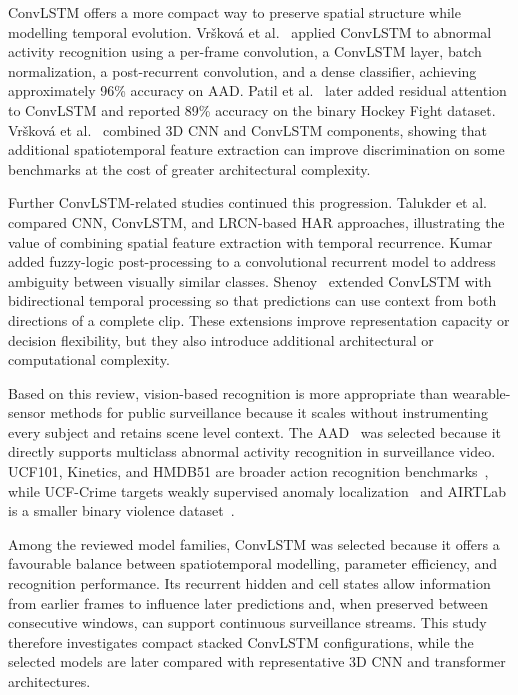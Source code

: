 \documentclass[journal,article,submit,moreauthors]{Definitions/mdpi}
\begin{document}
    ConvLSTM offers a more compact way to preserve spatial structure while 
    modelling temporal evolution. Vršková et al.~\cite{vrskova2022} applied 
    ConvLSTM to abnormal activity recognition using a per-frame convolution, 
    a ConvLSTM layer, batch normalization, a post-recurrent convolution,
    and a dense classifier, achieving approximately 96\% accuracy on AAD. 
    Patil et al.~\cite{residual_attention_convlstm2023} later added residual
    attention to ConvLSTM and reported 89\% accuracy on the binary Hockey 
    Fight dataset. Vršková et al.~\cite{vrskova2023_3dcnn_convlstm} combined 
    3D CNN and ConvLSTM components, showing that additional spatiotemporal 
    feature extraction can improve discrimination on some benchmarks at 
    the cost of greater architectural complexity.

    Further ConvLSTM-related studies continued this progression. Talukder 
    et al.~\cite{talukder2024cnn_convlstm_lrcn} compared CNN, ConvLSTM, 
    and LRCN-based HAR approaches, illustrating the value of combining 
    spatial feature extraction with temporal recurrence. 
    Kumar~\cite{kumar2024fuzzy} added fuzzy-logic post-processing to a 
    convolutional recurrent model to address ambiguity between visually 
    similar classes. Shenoy~\cite{bidirectional_convlstm2025} extended 
    ConvLSTM with bidirectional temporal processing so that predictions 
    can use context from both directions of a complete clip. These 
    extensions improve representation capacity or decision flexibility, 
    but they also introduce additional architectural or computational 
    complexity.

    Based on this review, vision-based recognition is more appropriate 
    than wearable-sensor methods for public surveillance because it 
    scales without instrumenting every subject and retains scene level 
    context. The AAD~\cite{vrskova2022} was selected because it directly
    supports multiclass abnormal activity recognition in surveillance
    video. UCF101, Kinetics, and HMDB51 are broader action recognition
    benchmarks~\cite{soomro2012ucf101,kay2017kinetics,kuehne2011hmdb}, while
    UCF-Crime targets weakly supervised anomaly 
    localization~\cite{sultani2018} and AIRTLab is a smaller binary 
    violence dataset~\cite{bianculli2020airtlab}. 
    
    Among the reviewed model families, ConvLSTM was selected because 
    it offers a favourable balance between spatiotemporal modelling, 
    parameter efficiency, and recognition performance. Its recurrent 
    hidden and cell states allow information from earlier frames to 
    influence later predictions and, when preserved between consecutive
    windows, can support continuous surveillance streams. This study 
    therefore investigates compact stacked ConvLSTM configurations, 
    while the selected models are later compared with representative 
    3D CNN and transformer architectures.
\end{document}
